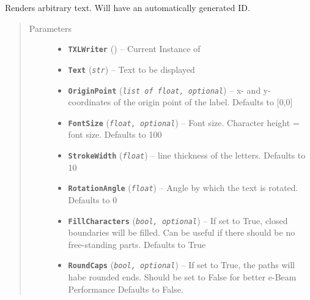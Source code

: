 \documentclass[letterpaper,10pt,english]{sphinxmanual}
\begin{document}
\begin{fulllineitems}
\label{Chapters/PythonModuleReference/ShapeLibrary/TXLWizard.ShapeLibrary.Label:TXLWizard.ShapeLibrary.Label.GetLabel}
Renders arbitrary text.
Will have an automatically generated ID.
\begin{quote}\begin{description}
\item[{Parameters}] \leavevmode\begin{itemize}
\item {} 
\textbf{\texttt{TXLWriter}} ({\hyperref[Chapters/PythonModuleReference/TXLWriter/TXLWizard.TXLWriter:TXLWizard.TXLWriter.TXLWriter]{}}) -- Current Instance of {\hyperref[Chapters/PythonModuleReference/TXLWriter/TXLWizard.TXLWriter:TXLWizard.TXLWriter.TXLWriter]{}}

\item {} 
\textbf{\texttt{Text}} (\emph{\texttt{str}}) -- Text to be displayed

\item {} 
\textbf{\texttt{OriginPoint}} (\emph{\texttt{list of float, optional}}) -- x- and y-coordinates of the origin point of the label.
Defaults to {[}0,0{]}

\item {} 
\textbf{\texttt{FontSize}} (\emph{\texttt{float, optional}}) -- Font size. Character height = font size.
Defaults to 100

\item {} 
\textbf{\texttt{StrokeWidth}} (\emph{\texttt{float}}) -- line thickness of the letters.
Defaults to 10

\item {} 
\textbf{\texttt{RotationAngle}} (\emph{\texttt{float}}) -- Angle by which the text is rotated.
Defaults to 0

\item {} 
\textbf{\texttt{FillCharacters}} (\emph{\texttt{bool, optional}}) -- If set to True, closed boundaries will be filled.
Can be useful if there should be no free-standing parts.
Defaults to True

\item {} 
\textbf{\texttt{RoundCaps}} (\emph{\texttt{bool, optional}}) -- If set to True, the paths will habe rounded ends. Should be set to False for better e-Beam Performance
Defaults to False.


\end{itemize}
\end{description}
\end{quote}
\end{fulllineitems}
\end{document}
